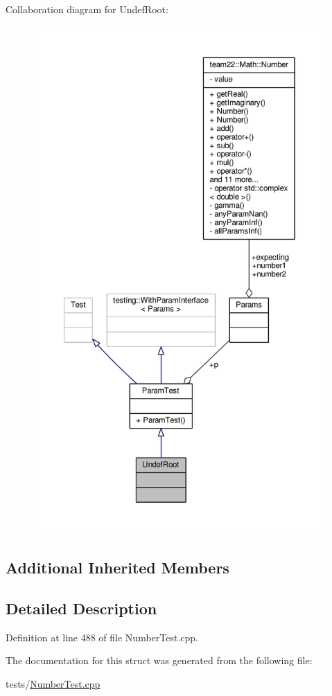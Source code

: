 Collaboration diagram for Undef\+Root\+:
\nopagebreak
\begin{figure}[H]
\begin{center}
\leavevmode
\includegraphics[height=550pt]{struct_undef_root__coll__graph}
\end{center}
\end{figure}
\subsection*{Additional Inherited Members}


\subsection{Detailed Description}


Definition at line 488 of file Number\+Test.\+cpp.



The documentation for this struct was generated from the following file\+:\begin{DoxyCompactItemize}
\item 
tests/\hyperlink{_number_test_8cpp}{Number\+Test.\+cpp}\end{DoxyCompactItemize}
